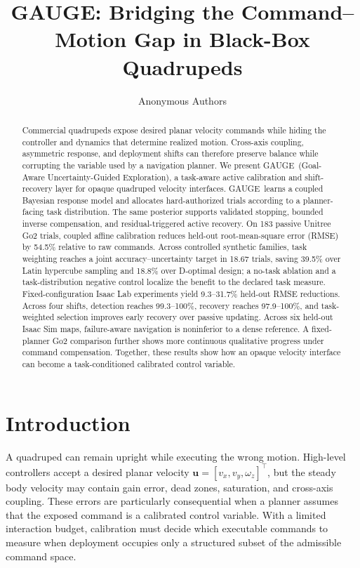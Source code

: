 \documentclass[letterpaper,10pt,conference]{ieeeconf}
\title{GAUGE: Bridging the Command--Motion Gap in Black-Box Quadrupeds}
\author{Anonymous Authors}
\newcommand{\method}{GAUGE}
\newcommand{\vect}[1]{\boldsymbol{#1}}
\begin{document}
\maketitle
\thispagestyle{empty}
\pagestyle{empty}

\begin{abstract}
Commercial quadrupeds expose desired planar velocity commands while hiding the
controller and dynamics that determine realized motion. Cross-axis coupling,
asymmetric response, and deployment shifts can therefore preserve balance while
corrupting the variable used by a navigation planner. We present \method\
(Goal-Aware Uncertainty-Guided \mbox{Exploration}), a task-aware active calibration and
shift-recovery layer for opaque quadruped velocity interfaces. \method\ learns a
coupled Bayesian response model and allocates hard-authorized trials according
to a planner-facing task distribution. The same posterior supports validated
stopping, bounded inverse compensation, and residual-triggered active recovery.
On 183 passive Unitree Go2 trials, coupled affine calibration reduces held-out
root-mean-square error (RMSE) by 54.5\% relative to raw commands. Across
controlled synthetic families, task weighting reaches a joint
accuracy--uncertainty target in 18.67 trials, saving 39.5\% over Latin hypercube
sampling and 18.8\% over D-optimal design; a no-task ablation and a
task-distribution negative control localize the benefit to the declared task
measure. Fixed-configuration Isaac Lab experiments yield 9.3--31.7\% held-out RMSE
reductions. Across four shifts, detection reaches 99.3--100\%, recovery reaches
97.9--100\%, and task-weighted selection improves early recovery over passive
updating. Across six held-out Isaac Sim maps, failure-aware navigation is
noninferior to a dense reference. A fixed-planner Go2 comparison further shows more continuous
qualitative progress under command compensation. Together, these results show
how an opaque velocity interface can become a task-conditioned calibrated
control variable.
\end{abstract}

\section{Introduction}

A quadruped can remain upright while executing the wrong motion. High-level
controllers accept a desired planar velocity
$\vect{u}=[v_x,v_y,\omega_z]^\top$, but the steady body velocity may contain
gain error, dead zones, saturation, and cross-axis coupling. These errors are
particularly consequential when a planner assumes that the exposed command is
a calibrated control variable. With a limited interaction budget, calibration
must decide which executable commands to measure when deployment occupies only
a structured subset of the admissible command space.
\end{document}
